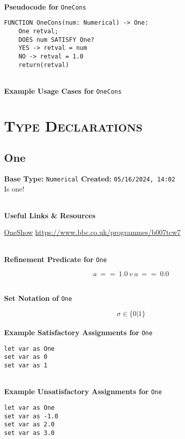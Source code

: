 \documentclass{article}
\begin{document}
\textbf{\\ Pseudocode for } \texttt{OneCons}
\begin{verbatim}
FUNCTION OneCons(num: Numerical) -> One:
	One retval;
	DOES num SATISFY One?
	YES -> retval = num
	NO -> retval = 1.0
	return(retval)
\end{verbatim}

\textbf{\\ Example Usage Cases for } \texttt{OneCons}
\clearpage

\section{\textsc{Type Declarations}}

\subsection{One}
\textbf{Base Type:} \verb|Numerical| \hfill \textbf{Created:} \verb|05/16/2024, 14:02| \\
Is one!


 \textbf{ \\ Useful Links \& Resources}

\href{https://www.bbc.co.uk/programmes/b007tcw7}{OneShow} \hfill \url{https://www.bbc.co.uk/programmes/b007tcw7} 

\textbf{\\ Refinement Predicate for } \texttt{One}

$$ a\ ==\ 1.0\ v\ a\ ==\ 0.0 $$

\textbf{\\ Set Notation of } \texttt{One}

$$\sigma \in \{ 0 | 1 \}$$ \ \
\textbf{\\ Example Satisfactory Assignments for } \texttt{One}
\begin{verbatim}
let var as One
set var as 0
set var as 1
\end{verbatim}


\textbf{\\ Example Unsatisfactory Assignments for } \texttt{One}
\begin{verbatim}
let var as One
set var as -1.0
set var as 2.0
set var as 3.0
\end{verbatim}


\clearpage
\end{document}
